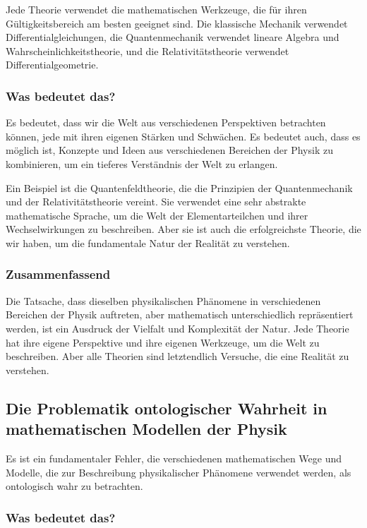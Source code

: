 \documentclass{article}
\begin{document}
Jede Theorie verwendet die mathematischen Werkzeuge, die für ihren Gültigkeitsbereich am besten geeignet sind. Die klassische Mechanik verwendet Differentialgleichungen, die Quantenmechanik verwendet lineare Algebra und Wahrscheinlichkeitstheorie, und die Relativitätstheorie verwendet Differentialgeometrie.

\subsubsection{Was bedeutet das?}

Es bedeutet, dass wir die Welt aus verschiedenen Perspektiven betrachten können, jede mit ihren eigenen Stärken und Schwächen. Es bedeutet auch, dass es möglich ist, Konzepte und Ideen aus verschiedenen Bereichen der Physik zu kombinieren, um ein tieferes Verständnis der Welt zu erlangen.

Ein Beispiel ist die Quantenfeldtheorie, die die Prinzipien der Quantenmechanik und der Relativitätstheorie vereint. Sie verwendet eine sehr abstrakte mathematische Sprache, um die Welt der Elementarteilchen und ihrer Wechselwirkungen zu beschreiben. Aber sie ist auch die erfolgreichste Theorie, die wir haben, um die fundamentale Natur der Realität zu verstehen.

\subsubsection{Zusammenfassend}

Die Tatsache, dass dieselben physikalischen Phänomene in verschiedenen Bereichen der Physik auftreten, aber mathematisch unterschiedlich repräsentiert werden, ist ein Ausdruck der Vielfalt und Komplexität der Natur. Jede Theorie hat ihre eigene Perspektive und ihre eigenen Werkzeuge, um die Welt zu beschreiben. Aber alle Theorien sind letztendlich Versuche, die eine Realität zu verstehen.
\subsection{Die Problematik ontologischer Wahrheit in mathematischen Modellen der Physik}

Es ist ein fundamentaler Fehler, die verschiedenen mathematischen Wege und Modelle, die zur Beschreibung physikalischer Phänomene verwendet werden, als ontologisch wahr zu betrachten.

\subsubsection{Was bedeutet das?}
\end{document}
